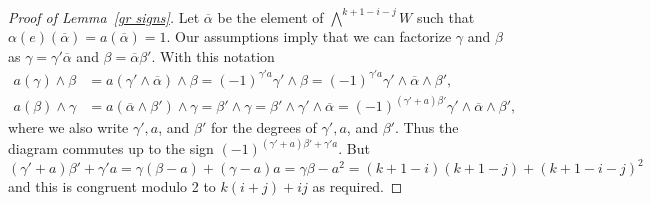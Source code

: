 \documentclass{jams-l}
\theoremstyle{definition}
\theoremstyle{remark}
\begin{document}
\begin{proof}[Proof of Lemma~\ref{gr signs}]
Let $\overline \alpha$ be the
element of $\bigwedge^{k+1-i-j}W$ such that
$\alpha(e)(\overline \alpha) = a(\overline \alpha)=1$. 
Our assumptions imply that we
can factorize $\gamma$ and $\beta$ 
as
$\gamma=\gamma'{\overline\alpha}$ and
$\beta=\overline\alpha \beta'$.
With this notation
\begin{align*}
a(\gamma)\wedge\beta&=
a(\gamma'\wedge\overline \alpha)\wedge \beta =
(-1)^{\gamma'a}\gamma'\wedge \beta =
(-1)^{\gamma'a}\gamma'\wedge \overline \alpha \wedge \beta',\\
a(\beta)\wedge\gamma&=
a(\overline \alpha\wedge\beta')\wedge \gamma =
\beta'\wedge \gamma =
\beta'\wedge \gamma'\wedge \overline \alpha  =
(-1)^{(\gamma'+a)\beta'} \gamma'\wedge \overline \alpha \wedge\beta',
\end{align*}
where we also write $\gamma', a$, and $\beta'$ for the
degrees of $\gamma', a$, and $\beta'$.
Thus the diagram commutes up to the sign
$
(-1)^{(\gamma'+a)\beta'+\gamma'a}.
$
But
$
(\gamma'+a)\beta'+\gamma'a=
\gamma(\beta-a)+(\gamma-a)a=
\gamma\beta-a^2=(k+1-i)(k+1-j)+(k+1-i-j)^2
$
and this is congruent modulo 2 to
$k(i+j)+ij$
as required.
\end{proof}
\end{document}

